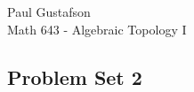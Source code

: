 \documentclass{article}
\begin{document}
\noindent Paul Gustafson\\
\noindent Math 643 - Algebraic Topology I

\subsection*{Problem Set 2} 
\end{document}
